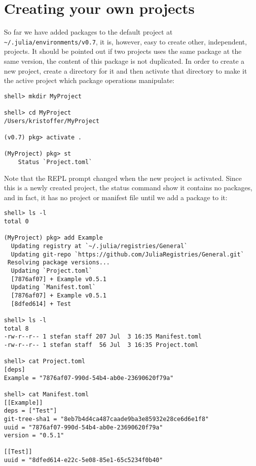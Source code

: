 \hypertarget{9268299237854436907}{}


\section{Creating your own projects}



So far we have added packages to the default project at \texttt{{\textasciitilde}/.julia/environments/v0.7}, it is, however, easy to create other, independent, projects. It should be pointed out if two projects uses the same package at the same version, the content of this package is not duplicated. In order to create a new project, create a directory for it and then activate that directory to make it the {\textquotedbl}active project{\textquotedbl} which package operations manipulate:




\begin{lstlisting}
shell> mkdir MyProject

shell> cd MyProject
/Users/kristoffer/MyProject

(v0.7) pkg> activate .

(MyProject) pkg> st
    Status `Project.toml`
\end{lstlisting}



Note that the REPL prompt changed when the new project is activated. Since this is a newly created project, the status command show it contains no packages, and in fact, it has no project or manifest file until we add a package to it:




\begin{lstlisting}
shell> ls -l
total 0

(MyProject) pkg> add Example
  Updating registry at `~/.julia/registries/General`
  Updating git-repo `https://github.com/JuliaRegistries/General.git`
 Resolving package versions...
  Updating `Project.toml`
  [7876af07] + Example v0.5.1
  Updating `Manifest.toml`
  [7876af07] + Example v0.5.1
  [8dfed614] + Test

shell> ls -l
total 8
-rw-r--r-- 1 stefan staff 207 Jul  3 16:35 Manifest.toml
-rw-r--r-- 1 stefan staff  56 Jul  3 16:35 Project.toml

shell> cat Project.toml
[deps]
Example = "7876af07-990d-54b4-ab0e-23690620f79a"

shell> cat Manifest.toml
[[Example]]
deps = ["Test"]
git-tree-sha1 = "8eb7b4d4ca487caade9ba3e85932e28ce6d6e1f8"
uuid = "7876af07-990d-54b4-ab0e-23690620f79a"
version = "0.5.1"

[[Test]]
uuid = "8dfed614-e22c-5e08-85e1-65c5234f0b40"
\end{lstlisting}



